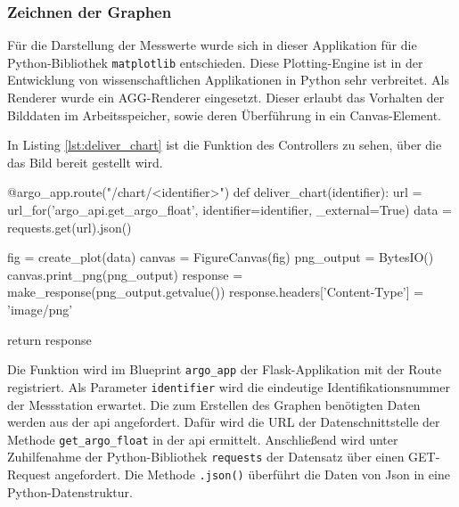 \subsubsection{Zeichnen der Graphen} \label{sec:ImplementierungPLOTS}


Für die Darstellung der Messwerte wurde sich in dieser Applikation für die Python-Bibliothek \texttt{matplotlib} entschieden.  Diese Plotting-Engine ist in der Entwicklung von wissenschaftlichen Applikationen in Python sehr verbreitet.
Als Renderer wurde ein AGG-Renderer eingesetzt. Dieser erlaubt das Vorhalten der Bilddaten im Arbeitsspeicher, sowie deren Überführung in ein Canvas-Element.

In Listing \ref{lst:deliver_chart} ist die Funktion des \gls{Controller}s zu sehen, über die das Bild bereit gestellt wird.

\begin{python}[label={lst:deliver_chart}, caption={Ausliefern eines Funktionsplots Flask}]
@argo_app.route("/chart/<identifier>")
def deliver_chart(identifier):
    url = url_for('argo_api.get_argo_float', identifier=identifier, _external=True)
    data = requests.get(url).json()

    fig = create_plot(data)
    canvas = FigureCanvas(fig)
    png_output = BytesIO()
    canvas.print_png(png_output)
    response = make_response(png_output.getvalue())
    response.headers['Content-Type'] = 'image/png'

    return response
\end{python}
\pagebreak
Die Funktion wird im Blueprint \texttt{argo\_app} der Flask-Applikation mit der Route registriert. Als Parameter \texttt{identifier}  wird die eindeutige Identifikationsnummer der Messstation erwartet. Die zum Erstellen des Graphen benötigten Daten werden aus der \gls{api} angefordert. Dafür wird die URL der Datenschnittstelle der Methode \texttt{get\_argo\_float} in der \gls{api} ermittelt. Anschließend wird unter Zuhilfenahme der Python-Bibliothek \texttt{requests} der Datensatz über einen GET-Request angefordert. Die Methode \texttt{.json()} überführt die Daten von Json in eine Python-Datenstruktur.

